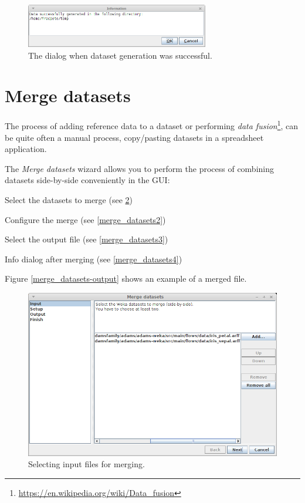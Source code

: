 \begin{figure}[htb]
  \centering
  \includegraphics[width=8.0cm]{images/makecompatible4.png}
  \caption{The dialog when dataset generation was successful.}
  \label{makecompatible4}
\end{figure}

\clearpage
\section{Merge datasets}
The process of adding reference data to a dataset or performing
\textit{data fusion}\footnote{\url{https://en.wikipedia.org/wiki/Data_fusion}{}},
can be quite often a manual process, copy/pasting datasets in a spreadsheet
application.

The \textit{Merge datasets} wizard allows you to perform the
process of combining datasets side-by-side conveniently in the GUI:
\begin{tight_itemize}
  \item Select the datasets to merge (see \ref{merge_datasets1})
  \item Configure the merge (see \ref{merge_datasets2})
  \item Select the output file (see \ref{merge_datasets3})
  \item Info dialog after merging (see \ref{merge_datasets4})
\end{tight_itemize}
Figure \ref{merge_datasets-output} shows an example of a merged file.

\begin{figure}[htb]
  \centering
  \includegraphics[width=12.0cm]{images/merge_datasets1.png}
  \caption{Selecting input files for merging.}
  \label{merge_datasets1}
\end{figure}

